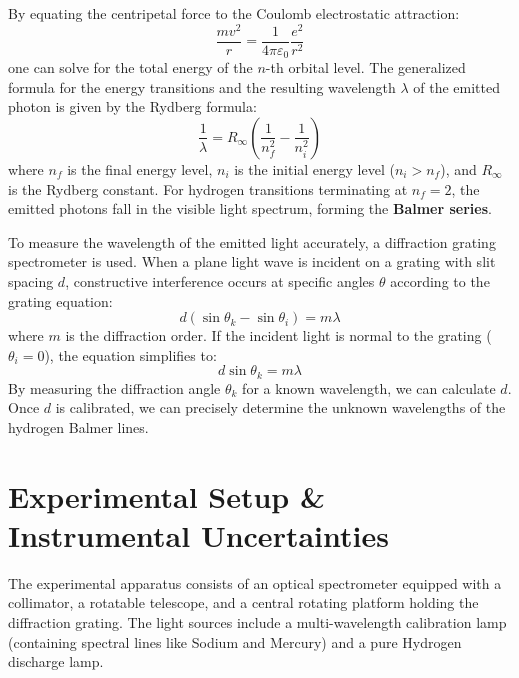 \documentclass[a4paper,11pt]{article}
\begin{document}
By equating the centripetal force to the Coulomb electrostatic attraction:
\begin{equation}
    \frac{m v^2}{r} = \frac{1}{4\pi\varepsilon_0} \frac{e^2}{r^2}
\end{equation}
one can solve for the total energy of the $n$-th orbital level. The generalized formula for the energy transitions and the resulting wavelength $\lambda$ of the emitted photon is given by the Rydberg formula:
\begin{equation}
    \frac{1}{\lambda} = R_\infty \left( \frac{1}{n_f^2} - \frac{1}{n_i^2} \right)
\end{equation}
where $n_f$ is the final energy level, $n_i$ is the initial energy level ($n_i > n_f$), and $R_\infty$ is the Rydberg constant. For hydrogen transitions terminating at $n_f = 2$, the emitted photons fall in the visible light spectrum, forming the \textbf{Balmer series}.

To measure the wavelength of the emitted light accurately, a diffraction grating spectrometer is used. When a plane light wave is incident on a grating with slit spacing $d$, constructive interference occurs at specific angles $\theta$ according to the grating equation:
\begin{equation}
    d (\sin\theta_k - \sin\theta_i) = m \lambda
\end{equation}
where $m$ is the diffraction order. If the incident light is normal to the grating ($\theta_i = 0$), the equation simplifies to:
\begin{equation}
    d \sin\theta_k = m \lambda
\end{equation}
By measuring the diffraction angle $\theta_k$ for a known wavelength, we can calculate $d$. Once $d$ is calibrated, we can precisely determine the unknown wavelengths of the hydrogen Balmer lines.

\section{Experimental Setup \& Instrumental Uncertainties}
The experimental apparatus consists of an optical spectrometer equipped with a collimator, a rotatable telescope, and a central rotating platform holding the diffraction grating. The light sources include a multi-wavelength calibration lamp (containing spectral lines like Sodium and Mercury) and a pure Hydrogen discharge lamp.
\end{document}
